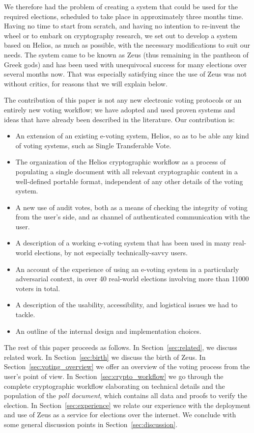 \documentclass[letterpaper,10pt]{article}
\begin{document}
We therefore had the problem of creating a system that could be used
for the required elections, scheduled to take place in approximately
three months time. Having no time to start from scratch, and having
no intention to re-invent the wheel or to embark on cryptography
research, we set out to develop a system based on Helios, as much as
possible, with the necessary modifications to suit our needs. The
system came to be known as Zeus (thus remaining in the pantheon of
Greek gods) and has been used with unequivocal success for many
elections over several months now. That was especially satisfying
since the use of Zeus was not without critics, for reasons that we
will explain below.

The contribution of this paper is not any new electronic voting
protocols or an entirely new voting workflow; we have adopted and used
proven systems and ideas that have already been described in the
literature. Our contribution is:
\begin{itemize}
\item An extension of an existing e-voting system, Helios, so as to be
  able any kind of voting systems, such as Single Transferable Vote.
\item The organization of the Helios cryptographic workflow as a
  process of populating a single document with all relevant
  cryptographic content in a well-defined portable format,
  independent of any other details of the voting system.
\item A new use of audit votes, both as a means of checking the
  integrity of voting from the user's side, and as channel of
  authenticated communication with the user.
\item A description of a working e-voting system that has been used in
  many real-world elections, by not especially technically-savvy
  users.
\item An account of the experience of using an e-voting system in a
  particularly adversarial context, in over 40 real-world elections
  involving more than 11000 voters in total.
\item A description of the usability, accessibility, and logistical
  issues we had to tackle.
\item An outline of the internal design and implementation choices.
\end{itemize}

The rest of this paper proceeds as follows. In
Section~\ref{sec:related}, we discuss related work. In
Section~\ref{sec:birth} we discuss the birth of Zeus. In
Section~\ref{sec:voting_overview} we offer an overview of the voting
process from the user's point of view. In
Section~\ref{sec:crypto_workflow} we go through the complete
cryptographic workflow elaborating on technical details and the
population of the \emph{poll document}, which contains all data and
proofs to verify the election. In Section~\ref{sec:experience} we
relate our experience with the deployment and use of Zeus as a service
for elections over the internet. We conclude with some general
discussion points in Section~\ref{sec:discussion}.
\end{document}
